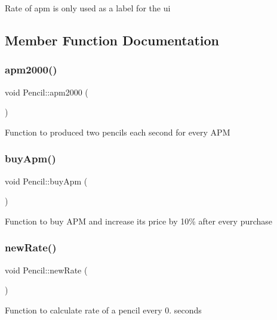 Rate of apm is only used as a label for the ui 

\subsection{Member Function Documentation}
\mbox{\label{classPencil_ad1f8942401865e05d2a220f64a309f3e}} 
\subsubsection{\texorpdfstring{apm2000()}{apm2000()}}
{\footnotesize\ttfamily void Pencil\+::apm2000 (\begin{DoxyParamCaption}{ }\end{DoxyParamCaption})}

Function to produced two pencils each second for every A\+PM \mbox{\label{classPencil_a506c7c9587a026f1238e880b1b103c2f}} 
\subsubsection{\texorpdfstring{buy\+Apm()}{buyApm()}}
{\footnotesize\ttfamily void Pencil\+::buy\+Apm (\begin{DoxyParamCaption}{ }\end{DoxyParamCaption})}

Function to buy A\+PM and increase its price by 10\% after every purchase \mbox{\label{classPencil_a759af90fe58f6399e831f2c53c0470bd}} 
\subsubsection{\texorpdfstring{new\+Rate()}{newRate()}}
{\footnotesize\ttfamily void Pencil\+::new\+Rate (\begin{DoxyParamCaption}{ }\end{DoxyParamCaption})}

Function to calculate rate of a pencil every 0. seconds \mbox{\label{classPencil_a9bbb66405447f4cc218ecbd1a09b7c3b}} 
